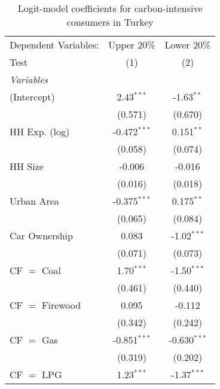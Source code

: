 
\begin{table}[htbp!]
   \centering
   \small
   \begin{adjustbox}{width = 1\textwidth, max height = 0.95\textheight, center}
      \begin{threeparttable}[b]
         \caption{\label{tab:Logit_1_TUR} Logit-model coefficients for carbon-intensive consumers in Turkey}
         \begin{tabular}{lcc}
            \tabularnewline \midrule \midrule
            Dependent Variables: & Upper 20\%     & Lower 20\%\\   
            Test                 & (1)            & (2)\\  
            \midrule
            \emph{Variables}\\
            (Intercept)          & 2.43$^{***}$   & -1.63$^{**}$\\   
                                 & (0.571)        & (0.670)\\   
            HH Exp. (log)        & -0.472$^{***}$ & 0.151$^{**}$\\   
                                 & (0.058)        & (0.074)\\   
            HH Size              & -0.006         & -0.016\\   
                                 & (0.016)        & (0.018)\\   
            Urban Area           & -0.375$^{***}$ & 0.175$^{**}$\\   
                                 & (0.065)        & (0.084)\\   
            Car Ownership        & 0.083          & -1.02$^{***}$\\   
                                 & (0.071)        & (0.073)\\   
            CF $=$ Coal          & 1.70$^{***}$   & -1.50$^{***}$\\   
                                 & (0.461)        & (0.440)\\   
            CF $=$ Firewood      & 0.095          & -0.112\\   
                                 & (0.342)        & (0.242)\\   
            CF $=$ Gas           & -0.851$^{***}$ & -0.630$^{***}$\\   
                                 & (0.319)        & (0.202)\\   
            CF $=$ LPG           & 1.23$^{***}$   & -1.37$^{***}$\\   

\end{tabular}
\end{threeparttable}
\end{adjustbox}
\end{table}
